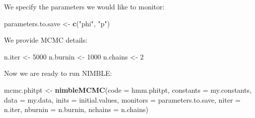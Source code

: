 \documentclass[
  12pt,
]{krantz}
\newenvironment{Shaded}{\begin{snugshade}}{\end{snugshade}}
\newcommand{\AttributeTok}[1]{\textcolor[rgb]{0.13,0.29,0.53}{#1}}
\newcommand{\CommentTok}[1]{\textcolor[rgb]{0.56,0.35,0.01}{\textit{#1}}}
\newcommand{\ControlFlowTok}[1]{\textcolor[rgb]{0.13,0.29,0.53}{\textbf{#1}}}
\newcommand{\DecValTok}[1]{\textcolor[rgb]{0.00,0.00,0.81}{#1}}
\newcommand{\FunctionTok}[1]{\textcolor[rgb]{0.13,0.29,0.53}{\textbf{#1}}}
\newcommand{\NormalTok}[1]{#1}
\newcommand{\OtherTok}[1]{\textcolor[rgb]{0.56,0.35,0.01}{#1}}
\newcommand{\SpecialCharTok}[1]{\textcolor[rgb]{0.81,0.36,0.00}{\textbf{#1}}}
\newcommand{\StringTok}[1]{\textcolor[rgb]{0.31,0.60,0.02}{#1}}
\begin{document}
\begin{Shaded}
\end{Shaded}

We specify the parameters we would like to monitor:

\begin{Shaded}
\begin{Highlighting}[]
\NormalTok{parameters.to.save }\OtherTok{\textless{}{-}} \FunctionTok{c}\NormalTok{(}\StringTok{"phi"}\NormalTok{, }\StringTok{"p"}\NormalTok{)}
\end{Highlighting}
\end{Shaded}

We provide MCMC details:

\begin{Shaded}
\begin{Highlighting}[]
\NormalTok{n.iter }\OtherTok{\textless{}{-}} \DecValTok{5000}
\NormalTok{n.burnin }\OtherTok{\textless{}{-}} \DecValTok{1000}
\NormalTok{n.chains }\OtherTok{\textless{}{-}} \DecValTok{2}
\end{Highlighting}
\end{Shaded}

Now we are ready to run NIMBLE:

\begin{Shaded}
\begin{Highlighting}[]
\NormalTok{mcmc.phitpt }\OtherTok{\textless{}{-}} \FunctionTok{nimbleMCMC}\NormalTok{(}\AttributeTok{code =}\NormalTok{ hmm.phitpt,}
                          \AttributeTok{constants =}\NormalTok{ my.constants,}
                          \AttributeTok{data =}\NormalTok{ my.data,}
                          \AttributeTok{inits =}\NormalTok{ initial.values,}
                          \AttributeTok{monitors =}\NormalTok{ parameters.to.save,}
                          \AttributeTok{niter =}\NormalTok{ n.iter,}
                          \AttributeTok{nburnin =}\NormalTok{ n.burnin,}
                          \AttributeTok{nchains =}\NormalTok{ n.chains)}
\end{Highlighting}
\end{Shaded}
\end{document}

